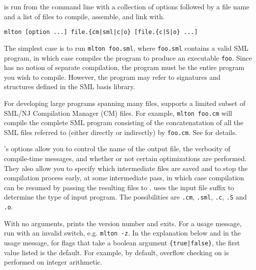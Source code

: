 
{\mlton} is run from the command line with a collection of options
followed by a file name and a list of files to compile, assemble, and
link with.
\begin{verbatim}
mlton [option ...] file.{cm|sml|c|o} [file.{c|S|o} ...]
\end{verbatim}
The simplest case is to run {\tt mlton foo.sml}, where {\tt foo.sml}
contains a valid SML program, in which case {\mlton} compiles the
program to produce an executable {\tt foo}.  Since {\mlton} has
no notion of separate compilation, the program must be the entire
program you wish to compile.  However, the program may refer to
signatures and structures defined in the SML basis library.

For developing large programs spanning many files, {\mlton} supports a
limited subset of SML/NJ Compilation Manager (CM) files.  For example,
{\tt mlton foo.cm} will compile the complete SML program consisting of
the concatenatation of all the SML files referred to (either directly
or indirectly) by {\tt foo.cm}.  See  for details.


{\mlton}'s options allow you to control the name of the output file,
the verbosity of compile-time messages, and whether or not certain
optimizations are performed.  They also allow you to specify which
intermediate files are saved and to stop the compilation process
early, at some intermediate pass, in which case compilation can be
resumed by passing the resulting files to {\mlton}.  {\mlton} uses the
input file suffix to determine the type of input program.  The
possibilities are {\tt .cm}, {\tt .sml}, {\tt .c}, {\tt .S} and {\tt
.o}.

With no arguments, {\mlton} prints the version number and exits.  For
a usage message, run {\mlton} with an invalid switch, e.g. {\tt mlton
-z}.  In the explanation below and in the usage message, for flags
that take a boolean argument {\tt \{true|false\}}, the first value
listed is the default.  For example, by default, overflow checking on
is performed on integer arithmetic.

\newcommand{\option}[1]{\item[{\tt #1}]\hspace{1em}\\}

